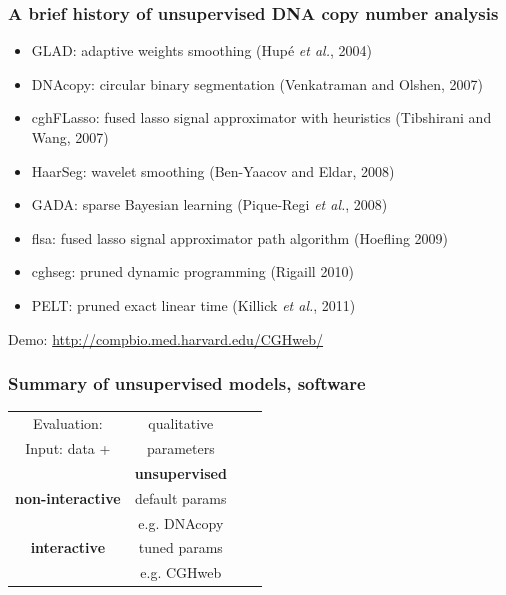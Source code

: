 \documentclass{beamer}
\begin{document}
\begin{frame}
  \frametitle{A brief history of unsupervised DNA copy number analysis}
  \begin{itemize}
  \item GLAD: adaptive weights smoothing (Hup\'e \textit{et al.}, 2004)
  \item DNAcopy: circular binary segmentation (Venkatraman and Olshen,
    2007)
  \item cghFLasso: fused lasso signal approximator with heuristics
    (Tibshirani and Wang, 2007)
  \item HaarSeg: wavelet smoothing (Ben-Yaacov and Eldar, 2008)
  \item GADA: sparse Bayesian learning (Pique-Regi \textit{et al.}, 2008)
  \item flsa: fused lasso signal approximator path algorithm (Hoefling 2009)
  \item cghseg: pruned dynamic programming (Rigaill 2010)
  \item PELT: pruned exact linear time (Killick \textit{et al.}, 2011)
  \end{itemize}
  Demo: \url{http://compbio.med.harvard.edu/CGHweb/}
\end{frame}

\begin{frame}
  \frametitle{Summary of unsupervised models, software}

  \begin{tabular}{c|c|c|c}
    Evaluation: & qualitative &  \\
    Input: data + & parameters & & \\
        & \textbf{unsupervised} & \\
    \hline
    \textbf{non-interactive}
    & default params &  \\
    & e.g. DNAcopy & \\
    \hline
    \textbf{interactive}
    & tuned params & \mbox{\hskip 1in} & \\
    & e.g. CGHweb & 
  \end{tabular}

\end{frame}
\end{document}
